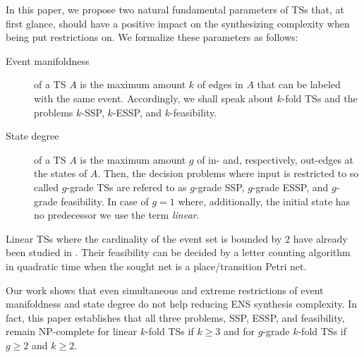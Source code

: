 \documentclass[english]{lipics_hacked}
\begin{document}
In this paper, we propose two natural fundamental parameters of TSs that, at first glance, should have a positive impact on the synthesizing complexity when being put restrictions on.
We formalize these parameters as follows:
%
\begin{description}
%
\item[Event manifoldness]
of a TS $A$ is the maximum amount $k$ of edges in $A$ that can be labeled with the same event.
Accordingly, we shall speak about $k$-fold TSs and the problems $k$-SSP, $k$-ESSP, and $k$-feasibility.  
%
\item[State degree]
of a TS $A$ is the maximum amount $g$ of in- and, respectively, out-edges at the states of $A$.
Then, the decision problems where input is restricted to so called $g$-grade TSs are refered to as $g$-grade SSP, $g$-grade ESSP, and $g$-grade feasibility.
In case of $g=1$ where, additionally, the initial state has no predecessor we use the term \emph{linear}.
%
\end{description}
%
Linear TSs where the cardinality of the event set is bounded by $2$ have already been studied in \cite{BESW2016}.
Their feasibility can be decided by a letter counting algorithm in quadratic time when the sought net is a place/transition Petri net.

Our work shows that even simultaneous and extreme restrictions of event manifoldness and state degree do not help reducing ENS synthesis complexity.
In fact, this paper establishes that all three problems, SSP, ESSP, and feasibility, remain NP-complete for linear $k$-fold TSs if $k\geq 3$ and for $g$-grade $k$-fold TSs if $g\geq 2$ and $k\geq 2$.
\end{document}
